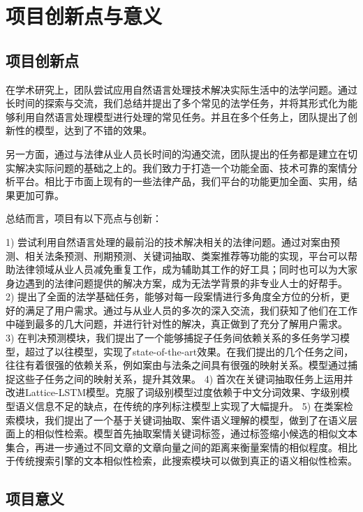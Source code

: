 \chapter{项目创新点与意义}
\label{cha: significance}

\section{项目创新点}

在学术研究上，团队尝试应用自然语言处理技术解决实际生活中的法学问题。通过长时间的探索与交流，我们总结并提出了多个常见的法学任务，并将其形式化为能够利用自然语言处理模型进行处理的常见任务。并且在多个任务上，团队提出了创新性的模型，达到了不错的效果。

另一方面，通过与法律从业人员长时间的沟通交流，团队提出的任务都是建立在切实解决实际问题的基础之上的。我们致力于打造一个功能全面、技术可靠的案情分析平台。相比于市面上现有的一些法律产品，我们平台的功能更加全面、实用，结果更加可靠。

总结而言，项目有以下亮点与创新：

1)	尝试利用自然语言处理的最前沿的技术解决相关的法律问题。通过对案由预测、相关法条预测、刑期预测、关键词抽取、类案推荐等功能的实现，平台可以帮助法律领域从业人员减免重复工作，成为辅助其工作的好工具；同时也可以为大家身边遇到的法律问题提供的解决方案，成为无法学背景的非专业人士的好帮手。
2)	提出了全面的法学基础任务，能够对每一段案情进行多角度全方位的分析，更好的满足了用户需求。通过与从业人员的多次的深入交流，我们获知了他们在工作中碰到最多的几大问题，并进行针对性的解决，真正做到了充分了解用户需求。
3)	在判决预测模块，我们提出了一个能够捕捉子任务间依赖关系的多任务学习模型，超过了以往模型，实现了state-of-the-art效果。在我们提出的几个任务之间，往往有着很强的依赖关系，例如案由与法条之间具有很强的映射关系。模型通过捕捉这些子任务之间的映射关系，提升其效果。
4)	首次在关键词抽取任务上运用并改进Lattice-LSTM模型。克服了词级别模型过度依赖于中文分词效果、字级别模型语义信息不足的缺点，在传统的序列标注模型上实现了大幅提升。
5)	在类案检索模块，我们提出了一个基于关键词抽取、案件语义理解的模型，做到了在语义层面上的相似性检索。模型首先抽取案情关键词标签，通过标签缩小候选的相似文本集合，再进一步通过不同文章的文章向量之间的距离来衡量案情的相似程度。相比于传统搜索引擎的文本相似性检索，此搜索模块可以做到真正的语义相似性检索。

\section{项目意义}





